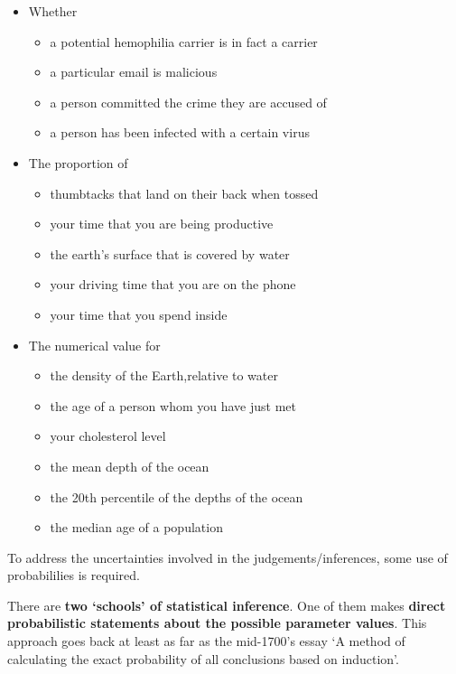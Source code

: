 \documentclass[]{book}
\providecommand{\tightlist}{%
  \setlength{\itemsep}{0pt}\setlength{\parskip}{0pt}}
\begin{document}
\begin{itemize}
\tightlist
\item
  Whether

  \begin{itemize}
  \tightlist
  \item
    a potential hemophilia carrier is in fact a carrier
  \item
    a particular email is malicious
  \item
    a person committed the crime they are accused of
  \item
    a person has been infected with a certain virus
  \end{itemize}
\item
  The proportion of

  \begin{itemize}
  \tightlist
  \item
    thumbtacks that land on their back when tossed
  \item
    your time that you are being productive
  \item
    the earth's surface that is covered by water
  \item
    your driving time that you are on the phone
  \item
    your time that you spend inside
  \end{itemize}
\item
  The numerical value for

  \begin{itemize}
  \tightlist
  \item
    the density of the Earth,relative to water
  \item
    the age of a person whom you have just met
  \item
    your cholesterol level
  \item
    the mean depth of the ocean
  \item
    the 20th percentile of the depths of the ocean
  \item
    the median age of a population
  \end{itemize}
\end{itemize}

To address the uncertainties involved in the judgements/inferences, some use of probabililies is required.

There are \textbf{two `schools' of statistical inference}. One of them makes \textbf{direct probabilistic statements about the possible parameter values}. This approach goes back at least as far as the mid-1700's essay `A method of calculating the exact probability of all conclusions based on induction'.
\end{document}

